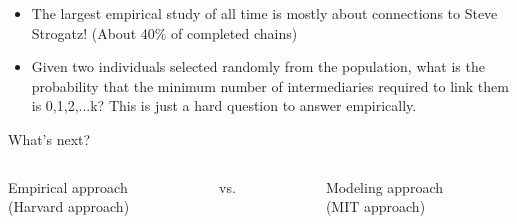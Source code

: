 \documentclass[aspectratio=169]{beamer}
\begin{document}
\begin{frame}

\begin{itemize}
\item The largest empirical study of all time is mostly about connections to Steve Strogatz! (About 40\% of completed chains) \pause
\item Given two individuals selected randomly from the population, what is the probability that the minimum number of intermediaries required to link them is 0,1,2,...k? This is just a hard question to answer empirically.
\end{itemize}


\end{frame}
\begin{frame}

What's next?

\end{frame}
\begin{frame}

\begin{center}
\begin{columns}
\begin{column}{0.4\textwidth}
Empirical approach\\(Harvard approach)
\end{column}
\begin{column}{0.2\textwidth}
vs.
\end{column}
\begin{column}{0.4\textwidth}
Modeling approach\\(MIT approach)
\end{column}
\end{columns}
\end{center}

\end{frame}
\end{document}
